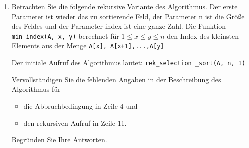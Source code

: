 \documentclass{lehramt-informatik-aufgabe}
\begin{document}
\begin{enumerate}
%

\item Betrachten Sie die folgende rekursive Variante des Algorithmus.
Der erste Parameter ist wieder das zu sortierende Feld, der Parameter
n ist die Größe des Feldes und der Parameter index ist eine ganze Zahl.
Die Funktion \texttt{min_index(A, x, y)} berechnet
für $1 \leq x \leq y \leq n$ den Index des kleinsten Elements aus der
Menge \texttt{{A[x], A[x+1],...,A[y]}}

Der initiale Aufruf des Algorithmus lautet:
\texttt{rek_selection _sort(A, n, 1)}

Vervollständigen Sie die fehlenden Angaben in der Beschreibung des
Algorithmus für

\begin{itemize}
\item die Abbruchbedingung in Zeile 4 und
\item den rekursiven Aufruf in Zeile 11.
\end{itemize}

Begründen Sie Ihre Antworten.
\end{enumerate}

\end{document}

